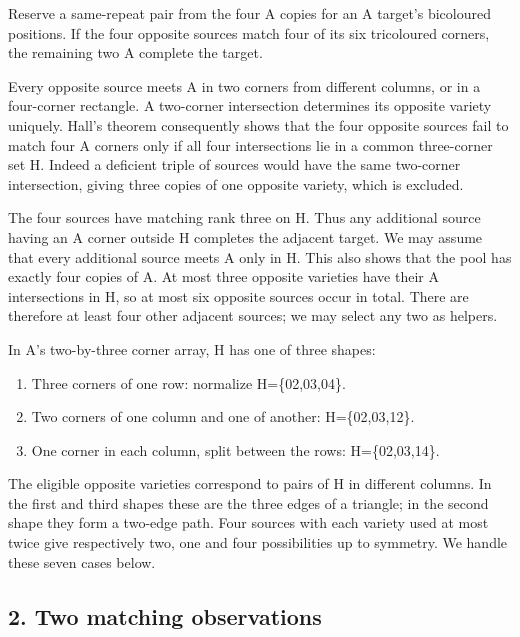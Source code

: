 \documentclass[
  10pt,
]{article}
\providecommand{\tightlist}{%
  \setlength{\itemsep}{0pt}\setlength{\parskip}{0pt}}
\begin{document}
Reserve a same-repeat pair from the four A copies for an A target's
bicoloured positions. If the four opposite sources match four of its six
tricoloured corners, the remaining two A complete the target.

Every opposite source meets A in two corners from different columns, or
in a four-corner rectangle. A two-corner intersection determines its
opposite variety uniquely. Hall's theorem consequently shows that the
four opposite sources fail to match four A corners only if all four
intersections lie in a common three-corner set H. Indeed a deficient
triple of sources would have the same two-corner intersection, giving
three copies of one opposite variety, which is excluded.

The four sources have matching rank three on H. Thus any additional
source having an A corner outside H completes the adjacent target. We
may assume that every additional source meets A only in H. This also
shows that the pool has exactly four copies of A. At most three opposite
varieties have their A intersections in H, so at most six opposite
sources occur in total. There are therefore at least four other adjacent
sources; we may select any two as helpers.

In A's two-by-three corner array, H has one of three shapes:

\begin{enumerate}
\def\labelenumi{\arabic{enumi}.}
\tightlist
\item
  Three corners of one row: normalize H=\{02,03,04\}.
\item
  Two corners of one column and one of another: H=\{02,03,12\}.
\item
  One corner in each column, split between the rows: H=\{02,03,14\}.
\end{enumerate}

The eligible opposite varieties correspond to pairs of H in different
columns. In the first and third shapes these are the three edges of a
triangle; in the second shape they form a two-edge path. Four sources
with each variety used at most twice give respectively two, one and four
possibilities up to symmetry. We handle these seven cases below.

\hypertarget{two-matching-observations}{%
\subsection*{2. Two matching
observations}\label{two-matching-observations}}
\end{document}
